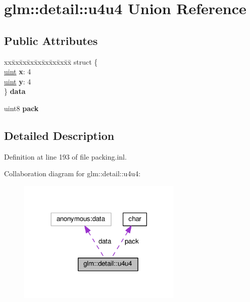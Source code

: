 \hypertarget{unionglm_1_1detail_1_1u4u4}{}\section{glm\+:\+:detail\+:\+:u4u4 Union Reference}
\label{unionglm_1_1detail_1_1u4u4}
\subsection*{Public Attributes}
\begin{DoxyCompactItemize}
\item 
\mbox{\label{unionglm_1_1detail_1_1u4u4_a48ec3d00452dbe6118fb2f5de7860b48}} 
\begin{tabbing}
xx\=xx\=xx\=xx\=xx\=xx\=xx\=xx\=xx\=\kill
struct \{\\
\mbox{\label{unionglm_1_1detail_1_1u4u4_ad6f08a7294800075b1d652c1468442d1}} 
\hyperlink{group__core__precision_ga4fd29415871152bfb5abd588334147c8}{uint} {\bfseries x}: 4\\
\mbox{\label{unionglm_1_1detail_1_1u4u4_a6c301224865ac75d250d3990acc49a0f}} 
\hyperlink{group__core__precision_ga4fd29415871152bfb5abd588334147c8}{uint} {\bfseries y}: 4\\
\} {\bfseries data}\\

\end{tabbing}\item 
\mbox{\label{unionglm_1_1detail_1_1u4u4_a823a2e3d7ae6e4710c0ceb40e191ef7b}} 
uint8 {\bfseries pack}
\end{DoxyCompactItemize}


\subsection{Detailed Description}


Definition at line 193 of file packing.\+inl.



Collaboration diagram for glm\+:\+:detail\+:\+:u4u4\+:
\nopagebreak
\begin{figure}[H]
\begin{center}
\leavevmode
\includegraphics[width=222pt]{d7/d4b/unionglm_1_1detail_1_1u4u4__coll__graph}
\end{center}
\end{figure}


